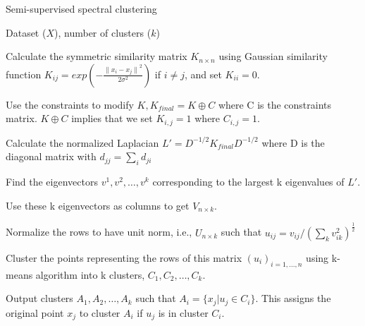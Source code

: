 \begin{algorithm}
\caption{Semi-supervised spectral clustering}
\label{alg:semi_sup_spectral_clustering}
\begin{algorithmic}[1]
\REQUIRE Dataset ($X$), number of clusters ($k$) 

\STATE Calculate the symmetric similarity matrix $K_{n \times n}$  using Gaussian similarity function  $K_{ij}=exp \left( -\frac{{\parallel x_{i}-x_{j} \parallel}^{2}}{2\sigma^{2}}\right)$ if $i\neq j$, and set $K_{ii}=0$. 

\STATE Use the constraints to modify $K, K_{final}=K \oplus C$ where C is the constraints matrix. $K \oplus C$ implies that we set $K_{i,j}=1$ where $C_{i,j}=1$. 

\STATE Calculate the normalized Laplacian $L'=D^{-1/2}K_{final}D^{-1/2}$ where D is the diagonal matrix with $d_{jj}=\sum_{i}d_{ji}$ 

\STATE Find the eigenvectors $v^{1},v^{2},\dots,v^{k}$ corresponding to the largest k eigenvalues of $L'$. 

\STATE Use these k eigenvectors as columns to get $V_{n \times k}$. 

\STATE Normalize the rows to have unit norm, i.e., $U_{n \times k}$ such that $u_{ij}= v_{ij}/(\sum_{k}{v_{ik}^{2}})^{\frac{1}{2}}$

\STATE Cluster the points representing the rows of this matrix $(u_{i})_{i=1,...,n}$ using k-means algorithm into k clusters, $C_{1},C_{2},\dots,C_{k}$.  

\STATE Output clusters $A_{1},A_{2},\dots,A_{k}$ such that $A_{i}=\{x_{j}|u_{j}\in C_{i}\}$. This assigns the original point $x_{j}$ to cluster $A_{i}$ if $u_{j}$ is in cluster $C_{i}$. 

\end{algorithmic}
\end{algorithm}


